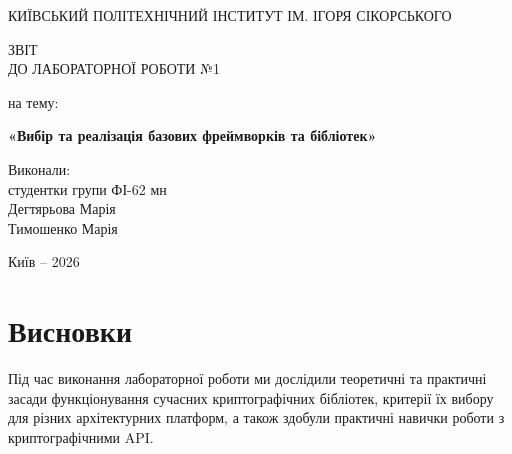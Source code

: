 \documentclass[12pt,a4paper]{article}
\begin{document}
\begin{titlepage}

\begin{center}

КИЇВСЬКИЙ ПОЛІТЕХНІЧНИЙ ІНСТИТУТ
ІМ. ІГОРЯ СІКОРСЬКОГО

\vspace{2cm}

{\large ЗВІТ}\\
{\large ДО ЛАБОРАТОРНОЇ РОБОТИ №1}

\vspace{1cm}

{\large на тему:}

\vspace{0.5cm}

\textbf{«Вибір та реалізація базових фреймворків та бібліотек»}

\end{center}

\vfill

\begin{flushright}
\begin{minipage}{0.4\textwidth}

Виконали:\\
студентки групи ФІ-62 мн\\
Дегтярьова Марія\\
Тимошенко Марія

\end{minipage}
\end{flushright}

\vfill

\begin{center}
Київ -- 2026
\end{center}

\end{titlepage}

\tableofcontents
\newpage








\section*{Висновки}

Під час виконання лабораторної роботи ми дослідили теоретичні та практичні засади функціонування сучасних криптографічних бібліотек, критерії їх вибору для різних архітектурних платформ, а також здобули практичні навички роботи з криптографічними API.
\end{document}
